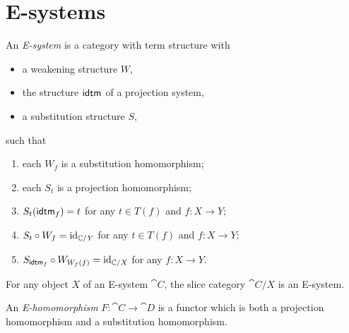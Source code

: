 \section{E-systems}
\begin{defn}
An \emph{E-system} is a category with term structure with
\begin{itemize}
\item a weakening structure $W$,
\item the structure $\tfid{}$ of a projection system,
\item a substitution structure $S$,
\end{itemize}
such that
\begin{enumerate}
\item each $W_f$ is a substitution homomorphism;
\item each $S_t$ is a projection homomorphism;
\item $S_t(\tfid{f})=t$ for any $t\in T(f)$ and $f:X\to Y$;
\item $S_t\circ W_f={\mathrm{id}_{\mathbb{C}/Y}}$ for any $t\in T(f)$ and $f:X\to Y$;
\item $S_{\tfid{f}}\circ W_{W_f(f)}=\catid{\cat{C}/X}$ for any $f:X\to Y$.
\end{enumerate}
\end{defn}

\begin{cor}
For any object $X$ of an E-system $\cat{C}$, the slice category $\cat{C}/X$
is an E-system.
\end{cor}

\begin{defn}
An \emph{E-homomorphism} $F:\cat{C}\to\cat{D}$ is a functor which is both a projection
homomorphism and a substitution homomorphism.
\end{defn}

